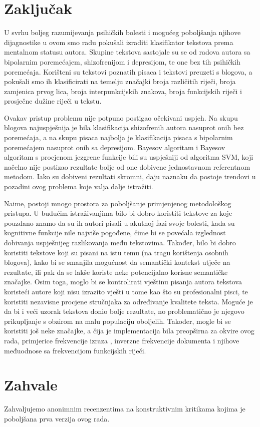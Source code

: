 \documentclass[10pt, a4paper]{article}
\begin{document}
\section{Zaključak}

U svrhu boljeg razumijevanja psihičkih bolesti i mogućeg poboljšanja njihove dijagnostike u ovom smo radu pokušali izraditi klasifikator tekstova prema mentalnom statusu autora. Skupine tekstova sastojale su se od radova autora sa bipolarnim poremećajem, shizofrenijom i depresijom, te one bez tih psihičkih poremećaja. Korišteni su tekstovi poznatih pisaca i tekstovi preuzeti s blogova, a pokušali smo ih klasificirati na temelju značajki broja različitih riječi, broja zamjenica prvog lica, broja interpunkcijskih znakova, broja funkcijskih riječi i prosječne dužine riječi u tekstu. 

Ovakav pristup problemu nije potpuno postigao očekivani uspjeh. Na skupu blogova najuspješnija je bila klasifikacija shizofrenih autora nasuprot onih bez poremećaja, a na skupu pisaca najbolja je klasifikacija pisaca s bipolarnim poremećajem nasuprot onih sa depresijom. Bayesov algoritam i Bayesov algoritam s procjenom jezgrene funkcije bili su uspješniji od algoritma SVM, koji načelno nije postizao rezultate bolje od one dobivene jednostavnom referentnom metodom. Iako su dobiveni rezultati skromni, daju naznaku da postoje trendovi u pozadini ovog problema koje valja dalje istražiti. 

Naime, postoji mnogo prostora za poboljšanje primjenjenog metodološkog pristupa. U budućim istraživanjima bilo bi dobro koristiti tekstove za koje pouzdano znamo da su ih autori pisali u akutnoj fazi svoje bolesti, kada su kognitivne funkcije nile najviše pogođene, čime bi se povećala izglednost dobivanja uspješnijeg razlikovanja među tekstovima. Također, bilo bi dobro koristiti tekstove koji su pisani na istu temu (na tragu korištenja osobnih blogova), kako bi se smanjila mogućnost da semantički kontekst utječe na rezultate, ili pak da se lakše koriste neke potencijalno korisne semantičke značajke. Osim toga, moglo bi se kontrolirati vještinu pisanja autora tekstova koristeći autore koji nisu izrazito vješti u tome kao što su profesionalni pisci, te koristiti nezavisne procjene stručnjaka za određivanje kvalitete teksta. Moguće je da bi i veći uzorak tekstova donio bolje rezultate, no problematično je njegovo prikupljanje s obzirom na malu populaciju oboljelih. Također, mogle bi se koristiti još neke značajke, a čija je implementacija bila preopširna za okvire ovog rada, primjerice frekvencije izraza , inverzne frekvencije dokumenta  i njihove međuodnose sa frekvencijom funkcijskih riječi.

\section*{Zahvale}
Zahvaljujemo anonimnim recenzentima na konstruktivnim kritikama kojima je poboljšana prva verzija ovog rada.


 
\end{document}
